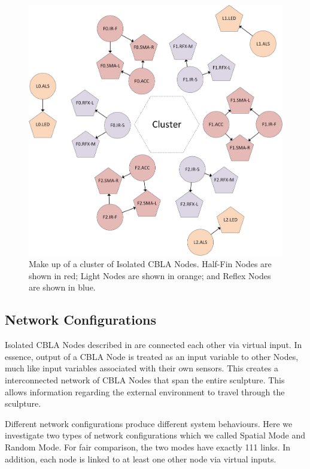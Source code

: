 \begin{figure} [!htbp]
	\centering
	\includegraphics[width=1.0\textwidth]{"fig/validations/Isolated CBLA Nodes"}
	\caption[Make up of a cluster of Isolated CBLA Nodes]{Make up of a cluster of Isolated CBLA Nodes. Half-Fin Nodes are shown in red; Light Nodes are shown in orange; and Reflex Nodes are shown in blue.}
	\label{fig:Isolated CBLA Nodes}
\end{figure}


\subsection{Network Configurations}

Isolated CBLA Nodes described in  are connected each other via virtual input. In essence, output of a CBLA Node is treated as an input variable to other Nodes, much like input variables associated with their own sensors. This creates a interconnected network of CBLA Nodes that span the entire sculpture. This allows information regarding the external environment to travel through the sculpture. 

Different network configurations produce different system behaviours. Here we investigate two types of network configurations which we called Spatial Mode and Random Mode. For fair comparison, the two modes have exactly 111 links. In addition, each node is linked to at least one other node via virtual inputs. 

